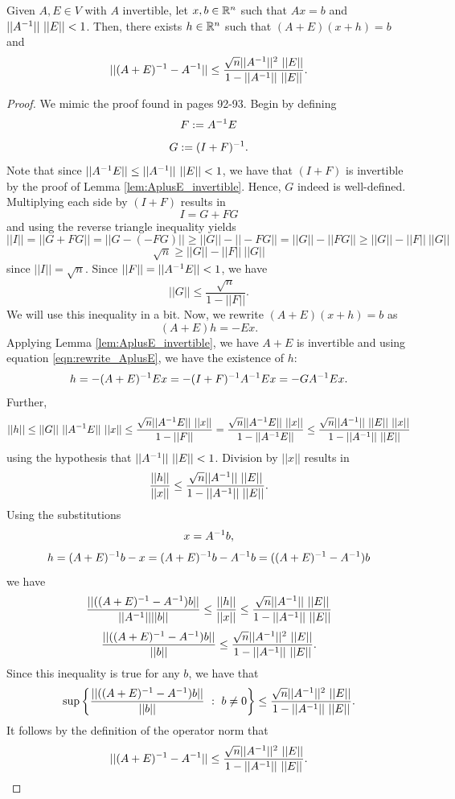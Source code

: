 \documentclass[letterpaper,titlepage]{article}
\begin{document}
\begin{lem}\label{lem:AplusEinv_minus_Ainv_ineq}
    Given $A, E\in V$ with $A$ invertible, let $x,b \in \mathbb{R}^n$ such that $Ax=b$ and $||A^{-1}||\ ||E||<1$. Then, there exists $h\in \mathbb{R}^n$ such that $(A+E)(x+h)=b$ and
    $$||(A+E)\inv-A\inv||\leq\frac{\sqrt{n}||A\inv||^2\ ||E||}{1-||A\inv||\ ||E||}.$$   
\end{lem}
\begin{proof}%
    We mimic the proof found in \cite{Wilkinson} pages 92-93. Begin by defining
    $$F:=A^{-1} E$$
    $$G:=(I+F)^{-1}.$$
    Note that since $||A^{-1} E|| \leq ||A^{-1}||\ ||E||<1$, we have that $(I+F)$ is invertible by the proof of Lemma \ref{lem:AplusE_invertible}. Hence, $G$ indeed is well-defined.
    Multiplying each side by $(I+F)$ results in
    $$I = G+FG$$
    and using the reverse triangle inequality yields
    $$||I|| = ||G+FG|| = ||G-(-FG)|| \geq ||G||-||-FG|| = ||G||-||FG|| \geq ||G||-||F||\ ||G||$$
    $$\sqrt{n} \geq ||G|| -||F||\ ||G||$$
    since $||I||=\sqrt{n}$. Since $||F||=||A^{-1} E|| <1$, we have
    $$||G|| \leq \frac{\sqrt{n}}{1-||F||}.$$
    We will use this inequality in a bit. Now, we rewrite $(A+E)(x+h)=b$ as
    $$(A+E)h=-Ex.$$
    Applying Lemma \ref{lem:AplusE_invertible}, we have $A+E$ is invertible and using equation \ref{eqn:rewrite_AplusE}, we have the existence of $h$:
    $$h = -(A+E)^{-1} Ex = -(I+F)^{-1} A^{-1} Ex=-GA^{-1} Ex.$$
    Further,
    $$||h|| \leq ||G||\ ||A\inv E||\ ||x|| \leq \frac{\sqrt{n}||A\inv E||\ ||x||}{1-||F||} = \frac{\sqrt{n}||A\inv E||\ ||x||}{1-||A\inv E||} \leq \frac{\sqrt{n}||A\inv||\ ||E||\ ||x||}{1-||A\inv||\ ||E||}$$
    using the hypothesis that $||A^{-1}||\ ||E|| < 1$.
    Division by $||x||$ results in
    $$\frac{||h||}{||x||}\leq \frac{\sqrt{n}||A^{-1}||\ ||E||}{1-||A^{-1}||\ ||E||}.$$
    Using the substitutions
    $$x = A^{-1} b,$$
    $$h = (A+E)^{-1} b - x = (A+E)^{-1} b - A^{-1} b = ((A+E)^{-1} -A^{-1})b$$
    we have
    $$\frac{||((A+E)\inv -A\inv)b||}{||A\inv||||b||} \leq \frac{||h||}{||x||} \leq \frac{\sqrt{n}||A\inv||\ ||E||}{1-||A\inv||\ ||E||} $$
    $$\frac{||((A+E)^{-1} -A^{-1})b||}{||b||} \leq \frac{\sqrt{n}||A^{-1}||^2\ ||E||}{1-||A^{-1}||\ ||E||}.$$
    Since this inequality is true for any $b$, we have that
    $$\sup\left\{\frac{||((A+E)\inv -A\inv)b||}{||b||}\ :\ b\neq 0\right\} \leq \frac{\sqrt{n}||A\inv||^2\ ||E||}{1-||A\inv||\ ||E||}.$$
    It follows by the definition of the operator norm that
    $$||(A+E)\inv-A\inv||\leq\frac{\sqrt{n}||A\inv||^2\ ||E||}{1-||A\inv||\ ||E||}.$$
\end{proof}
\end{document}
